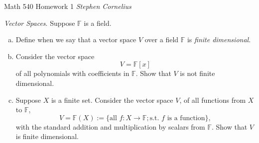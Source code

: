 \documentclass{article}
\begin{document}
\begin{center}
    Math 540
    \hfill Homework 1
    \hfill \textit{Stephen Cornelius}
\end{center}







\begin{problem}
    \textit{Vector Spaces}. Suppose $\mathbb{F}$ is a field.
    \begin{enumerate}[a)]
        \item Define when we say that a vector space $V$ over a field $\mathbb{F}$ is \textit{finite dimensional}.
        \item Consider the vector space
        \[
            V = \mathbb{F}[x]
        \]
        of all polynomials with coefficients in $\mathbb{F}$. Show that $V$ is not finite dimensional.
        \item Suppose $X$ is a finite set. Consider the vector space $V$, of all functions from $X$ to $\mathbb{F}$,
        \[
            V = \mathbb{F}(X):= \{\text{all }f: X \to \mathbb{F}; \text{s.t. $f$ is a function}\},
        \]
        with the standard addition and multiplication by scalars from $\mathbb{F}$. Show that $V$ is finite dimensional.
    \end{enumerate}
\end{problem}
\end{document}
